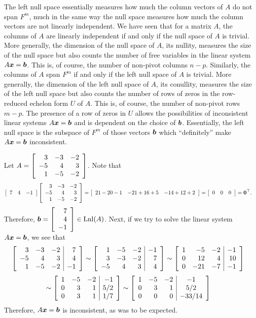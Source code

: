 The left null space essentially measures how much the column vectors of $A$ do not span $F^m$, much in the same way the null space measures how much the column vectors are not linearly independent. We have seen that for a matrix $A$, the columns of $A$ are linearly independent if and only if the null space of $A$ is trivial. More generally, the dimension of the null space of $A$, its nullity, measures the size of the null space but also counts the number of free variables in the linear system $A\bb x= \bb b$. This is, of course, the number of non-pivot columns $n-p$. Similarly, the columns of $A$ span $F^m$ if and only if the left null space of $A$ is trivial. More generally, the dimension of the left null space of $A$, its conullity, measures the size of the left null space but also counts the number of rows of zeros in the row-reduced echelon form $U$ of $A$. This is, of course, the number of non-pivot rows $m-p$. The presence of a row of zeros in $U$ allows the possibilities of inconsistent linear systems $A\bb x=\bb b$ and is dependent on the choice of $\bb b$. Essentially, the left null space is the subspace of $F^m$ of those vectors $\bb b$ which ``definitely'' make $A\bb x = \bb b$ inconsistent.\\

\begin{Exam}\label{exam:lnl} Let $A = \mtx{rrr}{3&-3&-2\\-5&4&3\\1&-5&-2}$. Note that 
\[\mtx{ccc}{7 & 4 & -1} \mtx{rrr}{3&-3&-2\\-5&4&3\\1&-5&-2} = \mtx{ccc}{21-20-1 & -21 +16+5 & -14 + 12 + 2} = \mtx{ccc}{0&0&0} = \bb 0^\top.\] Therefore, $\bb b = \vr{7\\4\\-1}\in \lnl(A)$. Next, if we try to solve the linear system $A\bb x = \bb b$, we see that 
\[\mtx{rrr|r}{3&-3&-2&7\\-5&4&3&4\\1&-5&-2&-1} \sim \mtx{rrr|r}{1&-5&-2&-1\\3&-3&-2&7\\-5&4&3&4} \sim \mtx{rrr|r}{1&-5&-2&-1\\0&12&4&10\\0&-21&-7&-1} \]
\[\sim \mtx{rrr|r}{1&-5&-2&-1\\0&3&1&5/2\\0&3&1&1/7} \sim  \mtx{rrr|c}{1&-5&-2&-1\\0&3&1&5/2\\0&0&0&-33/14}\] Therefore, $A\bb x = \bb b$ is inconsistent, as was to be expected.
\end{Exam}\vs

